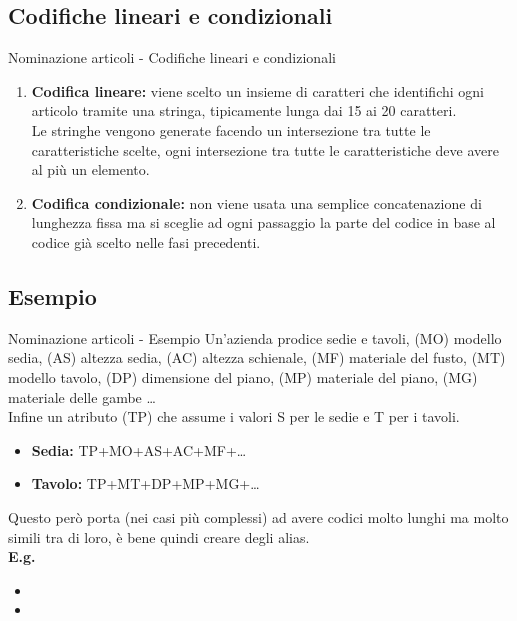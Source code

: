 \documentclass{beamer}
\begin{document}
\subsection{Codifiche lineari e condizionali}
\begin{frame}{Nominazione articoli - Codifiche lineari e condizionali}
    \begin{enumerate}
        \item \textbf{Codifica lineare:} viene scelto un insieme di caratteri che identifichi ogni articolo tramite una stringa, tipicamente lunga dai 15 ai 20 caratteri.\\
            Le stringhe vengono generate facendo un intersezione tra tutte le caratteristiche scelte, ogni intersezione tra tutte le caratteristiche deve avere al più un elemento.
        \item \textbf{Codifica condizionale:} non viene usata una semplice concatenazione di lunghezza fissa ma si sceglie ad ogni passaggio la parte del codice in base al codice già scelto nelle fasi precedenti.
    \end{enumerate}
\end{frame}

\subsection{Esempio}
\begin{frame}{Nominazione articoli - Esempio}
    Un'azienda prodice sedie e tavoli, (MO) modello sedia, (AS) altezza sedia, (AC) altezza schienale, (MF) materiale del fusto, (MT) modello tavolo, (DP) dimensione del piano, (MP) materiale del piano, (MG) materiale delle gambe \dots\\
    Infine un atributo (TP) che assume i valori S per le sedie e T per i tavoli.\\
    \begin{itemize}
        \item \textbf{Sedia:} TP+MO+AS+AC+MF+\dots
        \item \textbf{Tavolo:} TP+MT+DP+MP+MG+\dots
    \end{itemize}
    Questo però porta (nei casi più complessi) ad avere codici molto lunghi ma molto simili tra di loro, è bene quindi creare degli alias.\\
    \textbf{E.g.}\\
    \begin{itemize}
        \item \color{red}{Luxury01}
        \item \color{blue}{Luxury02}
    \end{itemize}
\end{frame}
\end{document}
